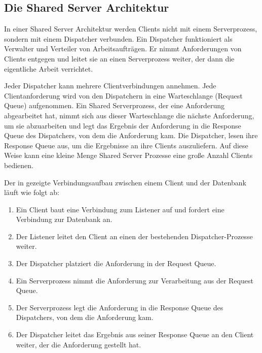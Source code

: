       \subsection{Die Shared Server Architektur}
        In einer Shared Server Architektur werden Clients nicht mit einem Serverprozess, sondern mit einem Dispatcher verbunden. Ein Dispatcher funktioniert als Verwalter und Verteiler von Arbeitsaufträgen. Er nimmt Anforderungen von Clients entgegen und leitet sie an einen Serverprozess weiter, der dann die eigentliche Arbeit verrichtet.


        Jeder Dispatcher kann mehrere Clientverbindungen annehmen. Jede Clientanforderung wird von den Dispatchern in eine Warteschlange (Request Queue) aufgenommen. Ein Shared Serverprozess, der eine Anforderung abgearbeitet hat, nimmt sich aus dieser Warteschlange die nächste Anforderung, um sie abzuarbeiten und legt das Ergebnis der Anforderung in die Response Queue des Dispatchers, von dem die Anforderung kam. Die Dispatcher, lesen ihre Response Queue aus, um die Ergebnisse an ihre Clients auszuliefern. Auf diese Weise kann eine kleine Menge Shared Server Prozesse eine große Anzahl Clients bedienen.

        Der in  gezeigte Verbindungsaufbau zwischen einem Client und der Datenbank läuft wie folgt ab:
\clearpage
          \begin{enumerate}
            \item Ein Client baut eine Verbindung zum Listener auf und fordert eine Verbindung zur Datenbank an.
            \item Der Listener leitet den Client an einen der bestehenden Dispatcher-Prozesse weiter.
            \item Der Dispatcher platziert die Anforderung in der Request Queue.
            \item Ein Serverprozess nimmt die Anforderung zur Verarbeitung aus der Request Queue.
            \item Der Serverprozess legt die Anforderung in die Response Queue des Dispatchers, von dem die Anforderung kam.
            \item Der Dispatcher leitet das Ergebnis aus seiner Response Queue an den Client weiter, der die Anforderung gestellt hat.
          \end{enumerate}

